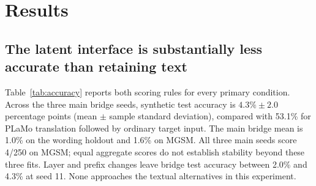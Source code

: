 \section{Results}
\label{sec:results}

\subsection{The latent interface is substantially less accurate than retaining text}

Table~\ref{tab:accuracy} reports both scoring rules for every primary condition.
Across the three main bridge seeds, synthetic test accuracy is
$4.3\%\pm2.0$ percentage points (mean $\pm$ sample standard deviation),
compared with 53.1\% for PLaMo translation followed by ordinary target input.
The main bridge mean is 1.0\% on the wording holdout and 1.6\% on MGSM.
All three main seeds score 4/250 on MGSM; equal aggregate scores do not establish
stability beyond these three fits.
Layer and prefix changes leave bridge test accuracy between 2.0\% and 4.3\%
at seed 11.
None approaches the textual alternatives in this experiment.


